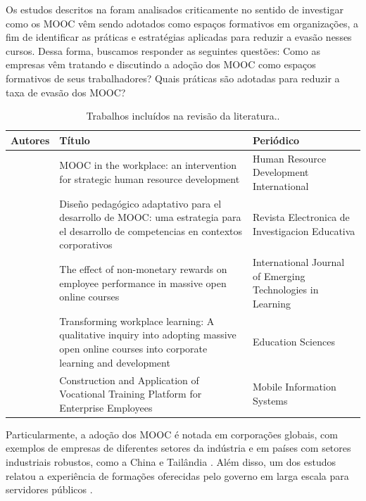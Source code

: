 \documentclass[portuguese]{textolivre}
\begin{document}
Os estudos descritos na  foram analisados criticamente no sentido de investigar como os MOOC vêm sendo adotados como espaços formativos em organizações, a fim de identificar as práticas e estratégias aplicadas para reduzir a evasão nesses cursos. Dessa forma, buscamos responder as seguintes questões: Como as empresas vêm tratando e discutindo a adoção dos MOOC como espaços formativos de seus trabalhadores? Quais práticas são adotadas para reduzir a taxa de evasão dos MOOC?

\begin{table}[h]
\centering
\begin{threeparttable}
\caption{Trabalhos incluídos na revisão da literatura..}
\label{tbl1}
\begin{tabular}{>{\raggedright\arraybackslash}p{3cm} >{\raggedright\arraybackslash}p{5cm} >{\raggedright\arraybackslash}p{3cm}}
\toprule
Autores & Título & Periódico \\ 
\midrule
\textcite{park_moocs_2021} & MOOC in the workplace: an intervention for strategic human resource development & Human Resource Development International \\ 
\textcite{becerra_diseno_2020} & Diseño pedagógico adaptativo para el desarrollo de MOOC: uma estrategia para el desarrollo de competencias en contextos corporativos & Revista Electronica de Investigacion Educativa \\
\textcite{sureephong_effect_2020} & The effect of non-monetary rewards on employee performance in massive open online courses & International Journal of Emerging Technologies in Learning \\
\textcite{zur_transforming_2021} & Transforming workplace learning: A qualitative inquiry into adopting massive open online courses into corporate learning and development & Education Sciences \\
\textcite{yan_construction_2022} & Construction and Application of Vocational Training Platform for Enterprise Employees & Mobile Information Systems \\
\bottomrule
\end{tabular}
\end{threeparttable}
\end{table}

Particularmente, a adoção dos MOOC é notada em corporações globais, com exemplos de empresas de diferentes setores da indústria \cite{park_moocs_2021} e em países com setores industriais robustos, como a China \cite{yan_construction_2022} e Tailândia \cite{sureephong_effect_2020}. Além disso, um dos estudos relatou a experiência de formações oferecidas pelo governo em larga escala para servidores públicos \cite{becerra_diseno_2020}.
\end{document}

